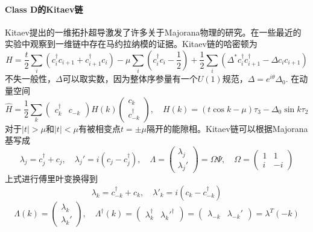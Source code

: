 \documentclass{article}
\numberwithin{equation}{subsection}
\begin{document}
\paragraph{Class D的Kitaev链}
Kitaev提出的一维拓扑超导激发了许多关于Majorana物理的研究。在一些最近的实验中观察到一维链中存在马约拉纳模的证据。Kitaev链的哈密顿为
\begin{equation}
    H=\frac{t}{2}\sum_{i}(c_i^\dagger c_{i+1}+c_{i+1}^\dagger c_i)-\mu\sum_{i}(c_i^\dagger c_i-\frac{1}{2})+\frac{1}{2}\sum_{i}(\Delta^*c_i^\dagger c_{i+1}^\dagger-\Delta c_ic_{i+1})
\end{equation}
不失一般性，$\Delta$可以取实数，因为整体序参量有一个$U(1)$规范，$\Delta=e^{i\theta}\Delta_0$. 在动量空间
\begin{equation}
    \hat{H}=\frac{1}{2}\sum_{k}\begin{pmatrix}
        c_k^\dagger&c_{-k}
    \end{pmatrix}H(k)\begin{pmatrix}
        c_k\\
        c_{-k}^\dagger
    \end{pmatrix},\quad H(k)=(t\cos k-\mu)\tau_3-\Delta_0\sin k\tau_2
\end{equation}
对于$|t|>\mu$和$|t|<\mu$有被相变点$t=\pm\mu$隔开的能隙相。Kitaev链可以根据Majorana基写成
\begin{equation}
    \lambda_j=c_j^\dagger+c_j,\quad \lambda_j'=i(c_j-c_j^\dagger),\quad\Lambda=\begin{pmatrix}
        \lambda_j\\
        \lambda_j'
    \end{pmatrix}=\Omega\Psi,\quad \Omega=\begin{pmatrix}
        1&1\\
        i&-i
    \end{pmatrix}
\end{equation}
上式进行傅里叶变换得到
\begin{equation}
    \lambda_k=c_{-k}^\dagger+c_k,\quad\lambda'_k=i(c_k-c_{-k}^\dagger)
\end{equation}
\begin{equation}
    \Lambda(k)=\begin{pmatrix}
        \lambda_k\\
        \lambda_k'
    \end{pmatrix},\quad\Lambda^\dagger(k)=\begin{pmatrix}
        \lambda_k^\dagger&\lambda_{k}'^\dagger
    \end{pmatrix}=\begin{pmatrix}
        \lambda_{-k}&\lambda_{-k}'
    \end{pmatrix}=\lambda^T(-k)
\end{equation}
\end{document}
